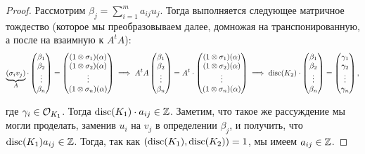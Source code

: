 \begin{proof}
	Рассмотрим $\beta_j = \sum_{i = 1}^{m} a_{i j } u_j$. Тогда выполняется следующее матричное тождество (которое мы преобразовываем далее, домножая на транспонированную, а после на взаимную к $A^{t}A$):
	\[
		\underbrace{(\sigma_i v_j)}_{A} \cdot \begin{pmatrix} \beta_1 \\ \beta_2 \\ \vdots \\ \beta_n \end{pmatrix} = \begin{pmatrix} (1 \otimes \sigma_1)(\alpha) \\ (1 \otimes \sigma_2)(\alpha) \\ \vdots \\ (1 \otimes \sigma_n)(\alpha) \end{pmatrix} \implies A^t A \begin{pmatrix} \beta_1 \\ \beta_2 \\ \vdots \\ \beta_n \end{pmatrix} = A^t \cdot \begin{pmatrix} (1 \otimes \sigma_1)(\alpha) \\ (1 \otimes \sigma_2)(\alpha) \\ \vdots \\ (1 \otimes \sigma_n)(\alpha) \end{pmatrix} \implies \operatorname{disc}(K_2) \cdot \begin{pmatrix} \beta_1 \\ \beta_2 \\ \vdots \\ \beta_n \end{pmatrix} = \begin{pmatrix} \gamma_1 \\ \gamma_2 \\ \vdots \\ \gamma_n \end{pmatrix},
	\]

	где $\gamma_i \in \mathcal{O}_{K_1}$. Тогда $\operatorname{disc}(K_1) \cdot a_{i j} \in \mathbb{Z}$. Заметим, что такое же рассуждение мы могли проделать, заменив $u_i$ на $v_j$ в определении $\beta_j$, и получить, что $\operatorname{disc}(K_1) a_{i j} \in \mathbb{Z}$. Тогда, так как $(\operatorname{disc}(K_1), \operatorname{disc}(K_2)) = 1$, мы имеем $a_{i j} \in \mathbb{Z}$.
	\end{proof}


